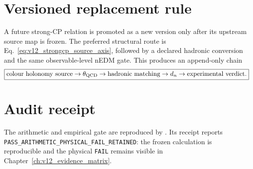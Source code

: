\section{Versioned replacement rule}

A future strong-CP relation is promoted as a new version only after its upstream source map is frozen. The preferred structural route is Eq.~\eqref{eq:v12_strongcp_source_axis}, followed by a declared hadronic conversion and the same observable-level nEDM gate. This produces an append-only chain
\[
\boxed{
\text{colour holonomy source}
\to\theta_{\rm QCD}
\to\text{hadronic matching}
\to d_n
\to\text{experimental verdict}.
}
\]

\section{Audit receipt}

The arithmetic and empirical gate are reproduced by
.
Its receipt
reports \texttt{PASS\_ARITHMETIC\_PHYSICAL\_FAIL\_RETAINED}: the frozen calculation is reproducible and the physical \texttt{FAIL} remains visible in Chapter~\ref{ch:v12_evidence_matrix}.

\clearpage
